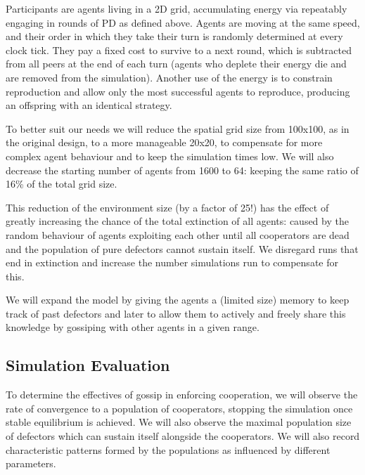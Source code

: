 \documentclass[english]{article}
\begin{document}
Participants are agents living in a 2D grid, accumulating energy via repeatably engaging in rounds of PD as defined above. Agents are moving at the same speed, and their order in which they take their turn is randomly determined at every clock tick. They pay a fixed cost to survive to a next round, which is subtracted from all peers at the end of each turn (agents who deplete their energy die and are removed from the simulation).
Another use of the energy is to constrain reproduction and allow only the most successful agents to reproduce, producing an offspring with an identical strategy.

To better suit our needs we will reduce the spatial grid size from 100x100, as in the original design, to a more manageable 20x20, to compensate for more complex agent behaviour and to keep the simulation times low. We will also decrease the starting number of agents from 1600 to 64: keeping the same ratio of 16\% of the total grid size.

This reduction of the environment size (by a factor of 25!) has the effect of greatly increasing the chance of the total extinction of all agents: caused by the random behaviour of agents exploiting each other until all cooperators are dead and the population of pure defectors cannot sustain itself.
We disregard runs that end in extinction and increase the number simulations run to compensate for this.

We will expand the model by giving the agents a (limited size) memory to keep track of past defectors and later to allow them to actively and freely share this knowledge by gossiping with other agents in a given range.

\subsection{Simulation Evaluation}

To determine the effectives of gossip in enforcing cooperation, we will observe the rate of convergence to a population of cooperators, stopping the simulation once stable equilibrium is achieved. We will also observe the maximal population size of defectors which can sustain itself alongside the cooperators.
We will also record characteristic patterns formed by the populations as influenced by different parameters.

\end{document}

